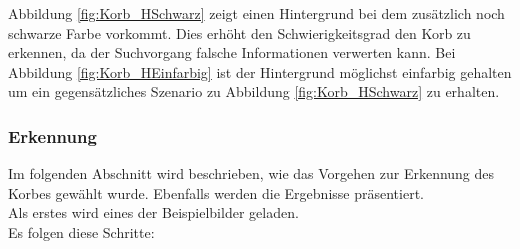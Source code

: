 Abbildung \ref{fig:Korb_HSchwarz} zeigt einen Hintergrund bei dem zusätzlich 
noch schwarze Farbe vorkommt. Dies erhöht den Schwierigkeitsgrad  den Korb zu 
erkennen, da der Suchvorgang falsche Informationen verwerten kann. Bei 
Abbildung \ref{fig:Korb_HEinfarbig} ist der Hintergrund möglichst einfarbig 
gehalten um ein gegensätzliches Szenario zu Abbildung \ref{fig:Korb_HSchwarz} 
zu erhalten.

\subsubsection{Erkennung}
Im folgenden Abschnitt wird beschrieben, wie das Vorgehen zur Erkennung des Korbes 
gewählt wurde. Ebenfalls werden die Ergebnisse präsentiert.\\
%
Als erstes wird eines der Beispielbilder geladen.\\
%
Es folgen diese Schritte:\\
%

